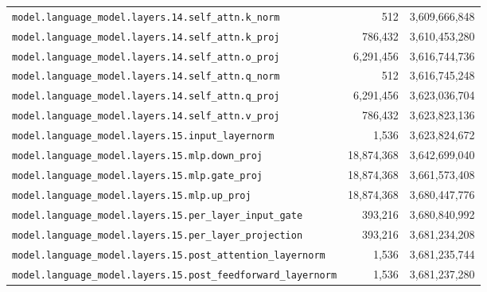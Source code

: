 \documentclass[10pt,a4paper]{article}
\theoremstyle{definition}
\begin{document}
\begin{appendices}
\begin{longtable}{p{9.5cm}rr}
\texttt{model.\allowbreak{}language\_model.\allowbreak{}layers.\allowbreak{}14.\allowbreak{}self\_attn.\allowbreak{}k\_norm} & 512 & 3,609,666,848 \\
\texttt{model.\allowbreak{}language\_model.\allowbreak{}layers.\allowbreak{}14.\allowbreak{}self\_attn.\allowbreak{}k\_proj} & 786,432 & 3,610,453,280 \\
\texttt{model.\allowbreak{}language\_model.\allowbreak{}layers.\allowbreak{}14.\allowbreak{}self\_attn.\allowbreak{}o\_proj} & 6,291,456 & 3,616,744,736 \\
\texttt{model.\allowbreak{}language\_model.\allowbreak{}layers.\allowbreak{}14.\allowbreak{}self\_attn.\allowbreak{}q\_norm} & 512 & 3,616,745,248 \\
\texttt{model.\allowbreak{}language\_model.\allowbreak{}layers.\allowbreak{}14.\allowbreak{}self\_attn.\allowbreak{}q\_proj} & 6,291,456 & 3,623,036,704 \\
\texttt{model.\allowbreak{}language\_model.\allowbreak{}layers.\allowbreak{}14.\allowbreak{}self\_attn.\allowbreak{}v\_proj} & 786,432 & 3,623,823,136 \\
\texttt{model.\allowbreak{}language\_model.\allowbreak{}layers.\allowbreak{}15.\allowbreak{}input\_layernorm} & 1,536 & 3,623,824,672 \\
\texttt{model.\allowbreak{}language\_model.\allowbreak{}layers.\allowbreak{}15.\allowbreak{}mlp.\allowbreak{}down\_proj} & 18,874,368 & 3,642,699,040 \\
\texttt{model.\allowbreak{}language\_model.\allowbreak{}layers.\allowbreak{}15.\allowbreak{}mlp.\allowbreak{}gate\_proj} & 18,874,368 & 3,661,573,408 \\
\texttt{model.\allowbreak{}language\_model.\allowbreak{}layers.\allowbreak{}15.\allowbreak{}mlp.\allowbreak{}up\_proj} & 18,874,368 & 3,680,447,776 \\
\texttt{model.\allowbreak{}language\_model.\allowbreak{}layers.\allowbreak{}15.\allowbreak{}per\_layer\_input\_gate} & 393,216 & 3,680,840,992 \\
\texttt{model.\allowbreak{}language\_model.\allowbreak{}layers.\allowbreak{}15.\allowbreak{}per\_layer\_projection} & 393,216 & 3,681,234,208 \\
\texttt{model.\allowbreak{}language\_model.\allowbreak{}layers.\allowbreak{}15.\allowbreak{}post\_attention\_layernorm} & 1,536 & 3,681,235,744 \\
\texttt{model.\allowbreak{}language\_model.\allowbreak{}layers.\allowbreak{}15.\allowbreak{}post\_feedforward\_layernorm} & 1,536 & 3,681,237,280 \\

\end{longtable}
\end{appendices}
\end{document}
